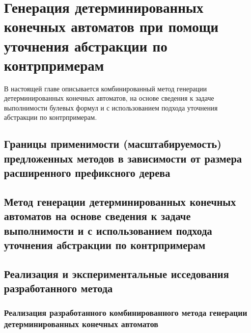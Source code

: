 
\chapter{Генерация детерминированных конечных автоматов при помощи уточнения абстракции по контрпримерам} 
\label{sec:cegar}

В настоящей главе описывается комбинированный метод генерации детерминированных конечных автоматов, на основе сведения к задаче выполнимости булевых формул и с использованием подхода уточнения абстракции по контрпримерам.

\section{Границы применимости (масштабируемость) предложенных методов в зависимости от размера расширенного префиксного дерева} %
\label{sec:cegar:motivation}


\section{Метод генерации детерминированных конечных автоматов на основе сведения к задаче выполнимости и с использованием подхода уточнения абстракции по контрпримерам}
\label{sec:cegar:cegar-algo}


\section{Реализация и экспериментальные исседования разработанного метода}
\label{sec:cegar:results}


\subsection{Реализация разработанного комбинированного метода генерации детерминированных конечных автоматов}
\label{sec:cegar:results:impl}

